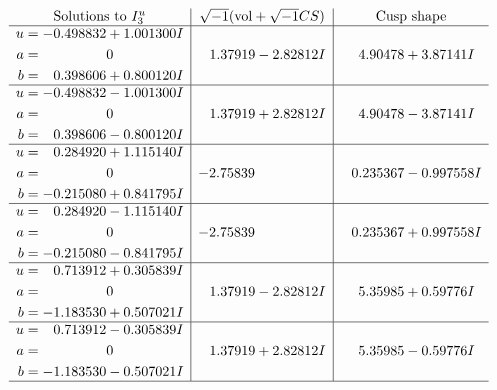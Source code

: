 \documentclass[1p]{elsarticle_modified}
\theoremstyle{definition}
\newcommand{\I}{\sqrt{-1}}
\begin{document}
$$\begin{array}{c|c|c}  
\text{Solutions to }I^u_{3}& \I (\text{vol} + \sqrt{-1}CS) & \text{Cusp shape}\\
 \hline 
\begin{aligned}
u &= -0.498832 + 1.001300 I \\
a &= \phantom{-0.000000 } 0 \\
b &= \phantom{-}0.398606 + 0.800120 I\end{aligned}
 & \phantom{-}1.37919 - 2.82812 I & \phantom{-}4.90478 + 3.87141 I \\ \hline\begin{aligned}
u &= -0.498832 - 1.001300 I \\
a &= \phantom{-0.000000 } 0 \\
b &= \phantom{-}0.398606 - 0.800120 I\end{aligned}
 & \phantom{-}1.37919 + 2.82812 I & \phantom{-}4.90478 - 3.87141 I \\ \hline\begin{aligned}
u &= \phantom{-}0.284920 + 1.115140 I \\
a &= \phantom{-0.000000 } 0 \\
b &= -0.215080 + 0.841795 I\end{aligned}
 & -2.75839\phantom{ +0.000000I} & \phantom{-}0.235367 - 0.997558 I \\ \hline\begin{aligned}
u &= \phantom{-}0.284920 - 1.115140 I \\
a &= \phantom{-0.000000 } 0 \\
b &= -0.215080 - 0.841795 I\end{aligned}
 & -2.75839\phantom{ +0.000000I} & \phantom{-}0.235367 + 0.997558 I \\ \hline\begin{aligned}
u &= \phantom{-}0.713912 + 0.305839 I \\
a &= \phantom{-0.000000 } 0 \\
b &= -1.183530 + 0.507021 I\end{aligned}
 & \phantom{-}1.37919 - 2.82812 I & \phantom{-}5.35985 + 0.59776 I \\ \hline\begin{aligned}
u &= \phantom{-}0.713912 - 0.305839 I \\
a &= \phantom{-0.000000 } 0 \\
b &= -1.183530 - 0.507021 I\end{aligned}
 & \phantom{-}1.37919 + 2.82812 I & \phantom{-}5.35985 - 0.59776 I\\
 \hline 
 \end{array}$$\newpage
\end{document}

